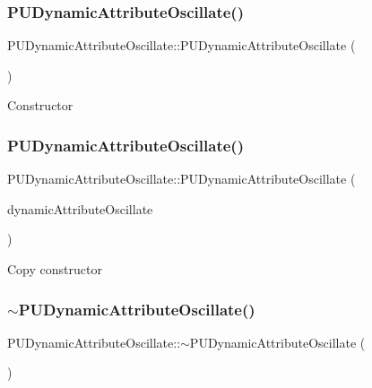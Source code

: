 \subsubsection{\texorpdfstring{P\+U\+Dynamic\+Attribute\+Oscillate()}{PUDynamicAttributeOscillate()}\hspace{0.1cm}{\footnotesize\ttfamily [3/4]}}
{\footnotesize\ttfamily P\+U\+Dynamic\+Attribute\+Oscillate\+::\+P\+U\+Dynamic\+Attribute\+Oscillate (\begin{DoxyParamCaption}\item[{void}]{ }\end{DoxyParamCaption})}

Constructor \mbox{\label{classPUDynamicAttributeOscillate_a63667f8e4d78ac81951fb5d050e2ed30}} 
\subsubsection{\texorpdfstring{P\+U\+Dynamic\+Attribute\+Oscillate()}{PUDynamicAttributeOscillate()}\hspace{0.1cm}{\footnotesize\ttfamily [4/4]}}
{\footnotesize\ttfamily P\+U\+Dynamic\+Attribute\+Oscillate\+::\+P\+U\+Dynamic\+Attribute\+Oscillate (\begin{DoxyParamCaption}\item[{const \hyperlink{classPUDynamicAttributeOscillate}{P\+U\+Dynamic\+Attribute\+Oscillate} \&}]{dynamic\+Attribute\+Oscillate }\end{DoxyParamCaption})}

Copy constructor \mbox{\label{classPUDynamicAttributeOscillate_a127238844b9c36e66e7a410961dc7dd8}} 
\subsubsection{\texorpdfstring{$\sim$\+P\+U\+Dynamic\+Attribute\+Oscillate()}{~PUDynamicAttributeOscillate()}\hspace{0.1cm}{\footnotesize\ttfamily [2/2]}}
{\footnotesize\ttfamily P\+U\+Dynamic\+Attribute\+Oscillate\+::$\sim$\+P\+U\+Dynamic\+Attribute\+Oscillate (\begin{DoxyParamCaption}\item[{void}]{ }\end{DoxyParamCaption})}

